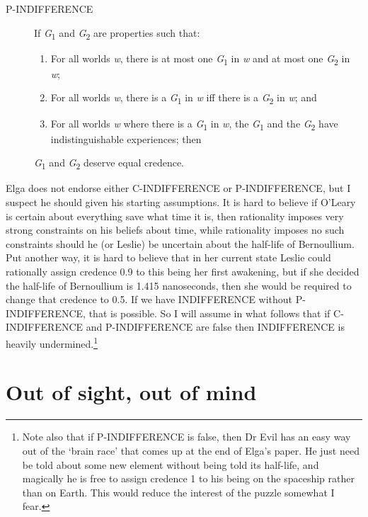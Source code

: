 \begin{description}
\item [P-INDIFFERENCE] If \textit{G}\textsubscript{1} and \textit{G}\textsubscript{2} are properties such that: 
\begin{enumerate}
\renewcommand{\labelenumi}{(\alph{enumi})}
\item For all worlds \textit{w}, there is at most one \textit{G}\textsubscript{1} in \textit{w} and at most one \textit{G}\textsubscript{2} in \textit{w}; 
\item For all worlds \textit{w}, there is a \textit{G}\textsubscript{1} in \textit{w} iff there is a \textit{G}\textsubscript{2} in \textit{w}; and 
\item For all worlds \textit{w} where there is a \textit{G}\textsubscript{1} in \textit{w}, the \textit{G}\textsubscript{1} and the \textit{G}\textsubscript{2} have indistinguishable experiences; then
\end{enumerate}
\textit{G}\textsubscript{1} and \textit{G}\textsubscript{2} deserve equal credence.
\end{description}

\noindent Elga does not endorse either C-INDIFFERENCE or P-INDIFFERENCE, but I suspect he should given his starting assumptions. It is hard to believe if O'Leary is certain about everything save what time it is, then rationality imposes very strong constraints on his beliefs about time, while rationality imposes no such constraints should he (or Leslie) be uncertain about the half-life of Bernoullium. Put another way, it is hard to believe that in her current state Leslie could rationally assign credence 0.9 to this being her first awakening, but if she decided the half-life of Bernoullium is 1.415 nanoseconds, then she would be required to change that credence to 0.5. If we have INDIFFERENCE without P\nobreakdash-INDIFFERENCE, that is possible. So I will assume in what follows that if C-INDIFFERENCE and P-INDIFFERENCE are false then INDIFFERENCE is heavily undermined.\footnote{Note also that if P\nobreakdash-INDIFFERENCE is false, then Dr Evil has an easy way out of the `brain race' that comes up at the end of Elga's paper. He just need be told about some new element without being told its half\nobreakdash-life, and magically he is free to assign credence 1 to his being on the spaceship rather than on Earth. This would reduce the interest of the puzzle somewhat I fear.}

\section{Out of sight, out of mind}

